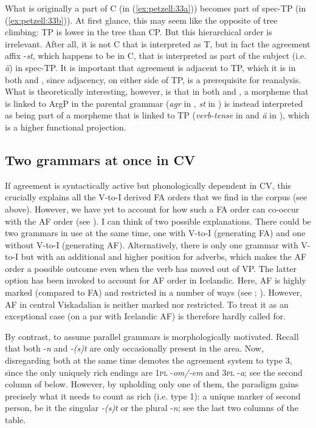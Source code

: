 \documentclass[output=paper,colorlinks,citecolor=brown,draft,draftmode]{langscibook}
\begin{document}
What is originally a part of C (in (\ref{ex:petzell:33a})) becomes part of spec-TP (in (\ref{ex:petzell:33b})). At first glance, this may seem like the opposite of tree climbing: TP is lower in the tree than CP. But this hierarchical order is irrelevant. After all, it is not C that is interpreted as T, but in fact the agreement affix -\textit{st}, which happens to be in C, that is interpreted as part of the subject (i.e. \textit{ä}) in spec-TP. It is important that agreement is adjacent to TP, which it is in both  and , since adjacency, on either side of TP, is a prerequisite for reanalysis. What is theoretically interesting, however, is that in both  and , a morpheme that is linked to ArgP in the parental grammar (\textit{agr} in , \textit{st} in ) is instead interpreted as being part of a morpheme that is linked to TP (\textit{verb-tense} in  and \textit{ä} in ), which is a higher functional projection.


\subsection{Two grammars at once in CV}\label{sec:petzell:5.3}


If agreement is syntactically active but phonologically dependent in CV, this crucially explains all the V-to-I derived FA orders that we find in the corpus (see  above). However, we have yet to account for how such a FA order can co-occur with the AF order (see ). I can think of two possible explanations. There could be two grammars in use at the same time, one with V-to-I (generating FA) and one without V-to-I (generating AF). Alternatively, there is only one grammar with V-to-I but with an additional and higher position for adverbs, which makes the AF order a possible outcome even when the verb has moved out of VP. The latter option has been invoked to account for AF order in Icelandic. Here, AF is highly marked (compared to FA) and restricted in a number of ways (see \citealt{BobaljikThrainsson1998}; \citealt{Thrainsson2007,Thrainsson2010}). However, AF in central Viskadalian is neither marked nor restricted. To treat it as an exceptional case (on a par with Icelandic AF) is therefore hardly called for.



By contrast, to assume parallel grammars is morphologically motivated. Recall that both -\textit{n} and \textit{-(s)t} are only occasionally present in the area. Now, disregarding both at the same time demotes the agreement system to type 3, since the only uniquely rich endings are 1\textsc{pl} -\textit{om/-em} and 3\textsc{pl} -\textit{a}; see the second column of  below. However, by upholding only one of them, the paradigm gains precisely what it needs to count as rich (i.e. type 1): a unique marker of second person, be it the singular \textit{-(s)t} or the plural -\textit{n}; see the last two columns of the table.
\end{document}
